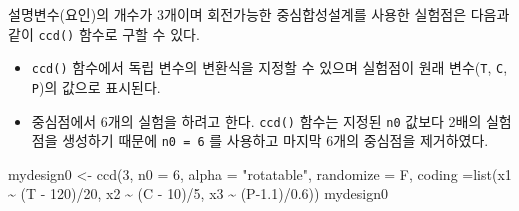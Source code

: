 \documentclass[
]{book}
\newenvironment{Shaded}{\begin{snugshade}}{\end{snugshade}}
\newcommand{\AttributeTok}[1]{\textcolor[rgb]{0.77,0.63,0.00}{#1}}
\newcommand{\DecValTok}[1]{\textcolor[rgb]{0.00,0.00,0.81}{#1}}
\newcommand{\FloatTok}[1]{\textcolor[rgb]{0.00,0.00,0.81}{#1}}
\newcommand{\FunctionTok}[1]{\textcolor[rgb]{0.00,0.00,0.00}{#1}}
\newcommand{\NormalTok}[1]{#1}
\newcommand{\OtherTok}[1]{\textcolor[rgb]{0.56,0.35,0.01}{#1}}
\newcommand{\SpecialCharTok}[1]{\textcolor[rgb]{0.00,0.00,0.00}{#1}}
\newcommand{\StringTok}[1]{\textcolor[rgb]{0.31,0.60,0.02}{#1}}
\providecommand{\tightlist}{%
  \setlength{\itemsep}{0pt}\setlength{\parskip}{0pt}}
\theoremstyle{definition}
\theoremstyle{definition}
\theoremstyle{definition}
\theoremstyle{definition}
\theoremstyle{remark}
\begin{document}
설명변수(요인)의 개수가 3개이며 회전가능한 중심합성설계를 사용한 실험점은
다음과 같이 \texttt{ccd()} 함수로 구할 수 있다.

\begin{itemize}
\tightlist
\item
  \texttt{ccd()} 함수에서 독립 변수의 변환식을 지정할 수 있으며 실험점이 원래 변수(\texttt{T}, \texttt{C}, \texttt{P})의 값으로 표시된다.
\item
  중심점에서 6개의 실험을 하려고 한다. \texttt{ccd()} 함수는 지정된 \texttt{n0} 값보다 2배의 실험점을 생성하기 때문에 \texttt{n0\ =\ 6} 를 사용하고 마지막 6개의 중심점을 제거하였다.
\end{itemize}

\begin{Shaded}
\begin{Highlighting}[]
\NormalTok{mydesign0 }\OtherTok{\textless{}{-}} \FunctionTok{ccd}\NormalTok{(}\DecValTok{3}\NormalTok{, }\AttributeTok{n0 =} \DecValTok{6}\NormalTok{, }\AttributeTok{alpha =} \StringTok{"rotatable"}\NormalTok{, }\AttributeTok{randomize =}\NormalTok{ F, }\AttributeTok{coding =}\FunctionTok{list}\NormalTok{(x1 }\SpecialCharTok{\textasciitilde{}}\NormalTok{ (T }\SpecialCharTok{{-}} \DecValTok{120}\NormalTok{)}\SpecialCharTok{/}\DecValTok{20}\NormalTok{, x2 }\SpecialCharTok{\textasciitilde{}}\NormalTok{ (C }\SpecialCharTok{{-}} \DecValTok{10}\NormalTok{)}\SpecialCharTok{/}\DecValTok{5}\NormalTok{, x3 }\SpecialCharTok{\textasciitilde{}}\NormalTok{ (P}\FloatTok{{-}1.1}\NormalTok{)}\SpecialCharTok{/}\FloatTok{0.6}\NormalTok{))}
\NormalTok{mydesign0}
\end{Highlighting}
\end{Shaded}
\end{document}
